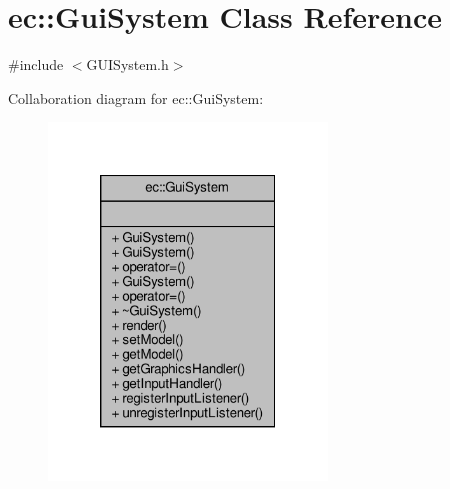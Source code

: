 \hypertarget{classec_1_1_gui_system}{}\section{ec\+:\+:Gui\+System Class Reference}
\label{classec_1_1_gui_system}


{\ttfamily \#include $<$G\+U\+I\+System.\+h$>$}



Collaboration diagram for ec\+:\+:Gui\+System\+:\nopagebreak
\begin{figure}[H]
\begin{center}
\leavevmode
\includegraphics[width=210pt]{classec_1_1_gui_system__coll__graph}
\end{center}
\end{figure}
